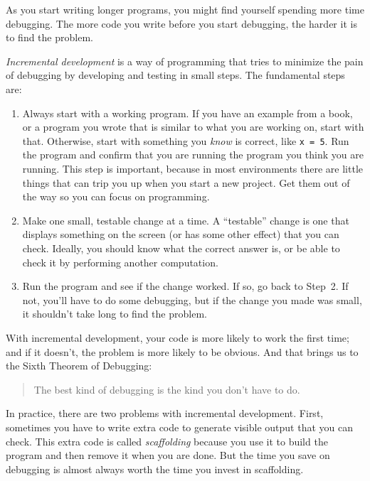 
As you start writing longer programs, you might find yourself spending more time debugging.
The more code you write before you start debugging, the harder it is to find
the problem.

\emph{Incremental development} is a way of programming that tries
to minimize the pain of debugging by developing and testing in small steps.  The fundamental steps are:

\begin{enumerate}

\item Always start with a working program.  If you have an
example from a book, or a program you wrote that is similar to
what you are working on, start with that.  Otherwise, start with
something you {\em know} is correct, like \lstinline{x = 5}.  Run the program
and confirm that you are running the program you think you are
running.
This step is important, because in most environments there
are little things that can trip you up when you start a new
project.  Get them out of the way so you can focus on programming.

\item Make one small, testable change at a time.  A ``testable''
change is one that displays something on the screen (or has some
other effect) that you can check.  Ideally, you should know what
the correct answer is, or be able to check it by performing another
computation.

\item Run the program and see if the change worked.  If so, go back
to Step~2.  If not, you'll have to do some debugging, but if the
change you made was small, it shouldn't take long to find the problem.

\end{enumerate}


With incremental development, your code is more likely to work the first time; and if it doesn't, the problem is more likely to be obvious.  And that brings us to the Sixth Theorem of Debugging:

\begin{quote}
The best kind of debugging is the kind you don't have to do.
\end{quote}

In practice, there are two problems with incremental development. 
First, sometimes you have to write extra code to
generate visible output that you can check.  This extra code is
called \emph{scaffolding} because you use it to build the program
and then remove it when you are done.  But the time you save on
debugging is almost always worth the time you invest in
scaffolding.

